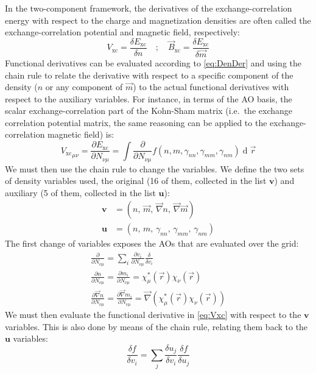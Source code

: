 \documentclass[12pt]{article}
\newcommand{\dd}{\operatorname{d}}
\newcommand*{\grad}{\vec{\nabla}}
\newcommand*{\pder}[2]{\frac{\partial #1}{\partial #2}}
\newcommand*{\dder}[2]{\frac{\delta #1}{\delta #2}}
\begin{document}
In the two-component framework, the derivatives of the exchange-correlation energy with respect to the charge and magnetization densities are often called the exchange-correlation potential and magnetic field, respectively:\cite{Gyorffy01_206403,Scuseria13_035117}
\begin{equation}
 V_\mathrm{xc} = \dder{E_\mathrm{xc}}{n} \quad;\quad \vec{B}_\mathrm{xc} = \dder{E_\mathrm{xc}}{\vec{m}}
\end{equation}
Functional derivatives can be evaluated according to \cref{eq:DenDer} and using the chain rule to relate the derivative with respect to a specific component of the density ($n$ or any component of $\vec{m}$) to the actual functional derivatives with respect to the auxiliary variables.
For instance, in terms of the AO basis, the scalar exchange-correlation part of the Kohn-Sham matrix (i.e.\ the exchange correlation potential matrix, the same reasoning can be applied to the exchange-correlation magnetic field) is:
\begin{equation}
\label{eq:Vxc}
 {V_\mathrm{xc}}_{\mu\nu} = \pder{E_\mathrm{xc}}{N_{\nu\mu}} = \int \pder{}{N_{\nu\mu}}f(n,m,\gamma_{nn},\gamma_{mm},\gamma_{nm})\dd\vec{r}
\end{equation}
We must then use the chain rule to change the variables.
We define the two sets of density variables used, the original (16 of them, collected in the list $\bm{v}$) and auxiliary (5 of them, collected in the list $\bm{u}$):
\begin{align}
 \bm{v} &= ( n ,\,\vec{m} ,\, \grad n ,\, \grad\vec{m} ) \\
 \bm{u} &= ( n ,\, m ,\, \gamma_{nn} ,\, \gamma_{mm} ,\, \gamma_{nm} ) 
\end{align}
The first change of variables exposes the AOs that are evaluated over the grid:
\begin{gather}
 \pder{}{N_{\nu\mu}} = \sum_i \pder{v_i}{N_{\nu\mu}}\dder{}{v_i} \\
 \pder{n}{N_{\nu\mu}} = \pder{m_i}{N_{\nu\mu}} = \chi^*_\mu(\vec{r})\chi_\nu(\vec{r}) \\
 \pder{\grad n}{N_{\nu\mu}} = \pder{\grad m_i}{N_{\nu\mu}} = \grad(\chi^*_\mu(\vec{r})\chi_\nu(\vec{r}))
\end{gather}
We must then evaluate the functional derivative in \cref{eq:Vxc} with respect to the $\bm{v}$ variables.
This is also done by means of the chain rule, relating them back to the $\bm{u}$ variables:
\begin{equation}
 \dder{f}{v_i} = \sum_j \dder{u_j}{v_i}\dder{f}{u_j}
\end{equation}
\end{document}
